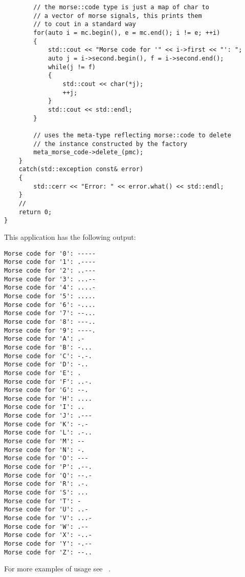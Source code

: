 \begin{verbatim}
        // the morse::code type is just a map of char to
        // a vector of morse signals, this prints them
        // to cout in a standard way
        for(auto i = mc.begin(), e = mc.end(); i != e; ++i)
        {
            std::cout << "Morse code for '" << i->first << "': ";
            auto j = i->second.begin(), f = i->second.end();
            while(j != f)
            {
                std::cout << char(*j);
                ++j;
            }
            std::cout << std::endl;
        }

        // uses the meta-type reflecting morse::code to delete
        // the instance constructed by the factory
        meta_morse_code->delete_(pmc);
    }
    catch(std::exception const& error)
    {
        std::cerr << "Error: " << error.what() << std::endl;
    }
    //
    return 0;
}
\end{verbatim}

This application has the following output:

\begin{verbatim}
Morse code for '0': -----
Morse code for '1': .----
Morse code for '2': ..---
Morse code for '3': ...--
Morse code for '4': ....-
Morse code for '5': .....
Morse code for '6': -....
Morse code for '7': --...
Morse code for '8': ---..
Morse code for '9': ----.
Morse code for 'A': .-
Morse code for 'B': -...
Morse code for 'C': -.-.
Morse code for 'D': -..
Morse code for 'E': .
Morse code for 'F': ..-.
Morse code for 'G': --.
Morse code for 'H': ....
Morse code for 'I': ..
Morse code for 'J': .---
Morse code for 'K': -.-
Morse code for 'L': .-..
Morse code for 'M': --
Morse code for 'N': -.
Morse code for 'O': ---
Morse code for 'P': .--.
Morse code for 'Q': --.-
Morse code for 'R': .-.
Morse code for 'S': ...
Morse code for 'T': -
Morse code for 'U': ..-
Morse code for 'V': ...-
Morse code for 'W': .--
Morse code for 'X': -..-
Morse code for 'Y': -.--
Morse code for 'Z': --..
\end{verbatim}

For more examples of usage see ~\cite{mirror-doc-lagoon-examples}.
